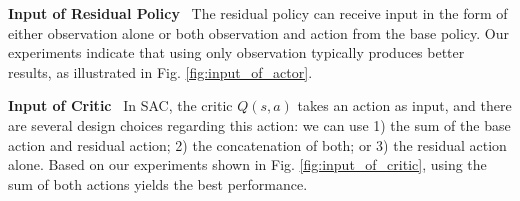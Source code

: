 \textbf{Input of Residual Policy}~
The residual policy can receive input in the form of either observation alone or both observation and action from the base policy. Our experiments indicate that using only observation typically produces better results, as illustrated in Fig. \ref{fig:input_of_actor}.

\textbf{Input of Critic}~
In SAC, the critic $Q(s, a)$ takes an action as input, and there are several design choices regarding this action: we can use 1) the sum of the base action and residual action; 2) the concatenation of both; or 3) the residual action alone. Based on our experiments shown in Fig. \ref{fig:input_of_critic}, using the sum of both actions yields the best performance. 










    
    









